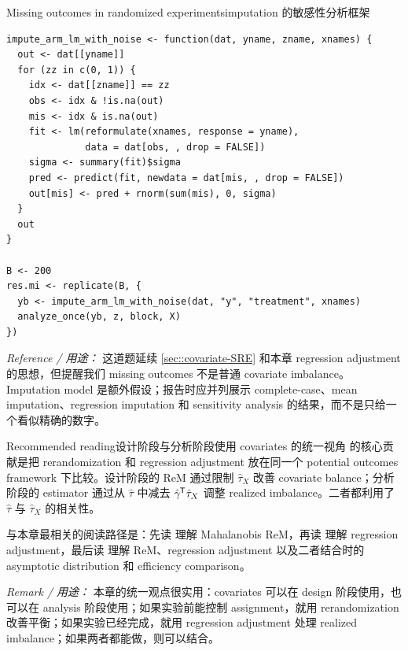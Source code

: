 \begin{exercisesolution}{Missing outcomes in randomized experiments}{imputation 的敏感性分析框架}
\begin{lstlisting}
impute_arm_lm_with_noise <- function(dat, yname, zname, xnames) {
  out <- dat[[yname]]
  for (zz in c(0, 1)) {
    idx <- dat[[zname]] == zz
    obs <- idx & !is.na(out)
    mis <- idx & is.na(out)
    fit <- lm(reformulate(xnames, response = yname),
              data = dat[obs, , drop = FALSE])
    sigma <- summary(fit)$sigma
    pred <- predict(fit, newdata = dat[mis, , drop = FALSE])
    out[mis] <- pred + rnorm(sum(mis), 0, sigma)
  }
  out
}

B <- 200
res.mi <- replicate(B, {
  yb <- impute_arm_lm_with_noise(dat, "y", "treatment", xnames)
  analyze_once(yb, z, block, X)
})
\end{lstlisting}

\emph{Reference / 用途：} 这道题延续 \cref{sec::covariate-SRE} 和本章 regression adjustment 的思想，但提醒我们 missing outcomes 不是普通 covariate imbalance。Imputation model 是额外假设；报告时应并列展示 complete-case、mean imputation、regression imputation 和 sensitivity analysis 的结果，而不是只给一个看似精确的数字。
\end{exercisesolution}

\begin{exercisesolution}{Recommended reading}{设计阶段与分析阶段使用 covariates 的统一视角}
\citet{li2019rerandomization} 的核心贡献是把 rerandomization 和 regression adjustment 放在同一个 potential outcomes framework 下比较。设计阶段的 ReM 通过限制 $\hat\tau_X$ 改善 covariate balance；分析阶段的 \citet{lin2013} estimator 通过从 $\hat\tau$ 中减去 $\hat\gamma^{\mkern-1.5mu\mathsf{T}}\hat\tau_X$ 调整 realized imbalance。二者都利用了 $\hat\tau$ 与 $\hat\tau_X$ 的相关性。

与本章最相关的阅读路径是：先读 \citet{morgan2012rerandomization} 理解 Mahalanobis ReM，再读 \citet{lin2013} 理解 regression adjustment，最后读 \citet{li2018asymptotic,li2019rerandomization} 理解 ReM、regression adjustment 以及二者结合时的 asymptotic distribution 和 efficiency comparison。

\emph{Remark / 用途：} 本章的统一观点很实用：covariates 可以在 design 阶段使用，也可以在 analysis 阶段使用；如果实验前能控制 assignment，就用 rerandomization 改善平衡；如果实验已经完成，就用 regression adjustment 处理 realized imbalance；如果两者都能做，则可以结合。
\end{exercisesolution}
